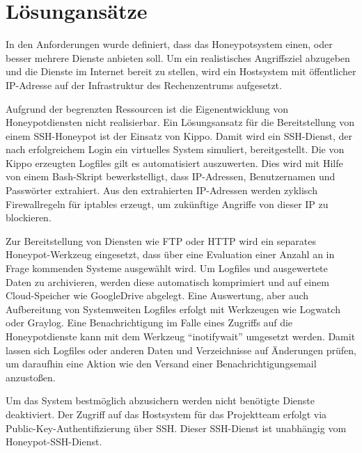 \chapter{Lösungansätze}
\label{ch:Lösungansätze}

In den Anforderungen wurde definiert, dass das Honeypotsystem einen, oder besser mehrere Dienste anbieten soll. Um ein realistisches Angriffsziel abzugeben und die Dienste im Internet bereit zu stellen, wird ein Hostsystem mit öffentlicher IP-Adresse auf der Infrastruktur des Rechenzentrums aufgesetzt.

Aufgrund der begrenzten Ressourcen ist die Eigenentwicklung von Honeypotdiensten  nicht realisierbar. Ein Lösungsansatz für die Bereitstellung von einem SSH-Honeypot ist der Einsatz von Kippo. Damit wird ein SSH-Dienst, der nach erfolgreichem Login ein virtuelles System simuliert, bereitgestellt. Die von Kippo erzeugten Logfiles gilt es automatisiert auszuwerten. Dies wird mit Hilfe von einem Bash-Skript bewerkstelligt, dass IP-Adressen, Benutzernamen und Passwörter extrahiert. Aus den extrahierten IP-Adressen werden zyklisch Firewallregeln für iptables erzeugt, um zukünftige Angriffe von dieser IP zu blockieren.

Zur Bereitstellung von Diensten wie FTP oder HTTP wird ein separates Honeypot-Werkzeug eingesetzt, dass über eine Evaluation einer Anzahl an in Frage kommenden Systeme ausgewählt wird.
Um Logfiles und ausgewertete Daten zu archivieren, werden diese automatisch komprimiert und auf einem Cloud-Speicher wie GoogleDrive abgelegt. Eine Auswertung, aber auch Aufbereitung von Systemweiten Logfiles erfolgt mit Werkzeugen wie Logwatch oder Graylog.
Eine Benachrichtigung im Falle eines Zugriffs auf die Honeypotdienste kann mit dem Werkzeug “inotifywait” umgesetzt werden. Damit lassen sich Logfiles oder anderen Daten und Verzeichnisse auf Änderungen prüfen, um daraufhin eine Aktion wie den Versand einer Benachrichtigungsemail anzustoßen.

Um das System bestmöglich abzusichern werden nicht benötigte Dienste deaktiviert. Der Zugriff auf das Hostsystem für das Projektteam erfolgt via Public-Key-Authentifizierung über SSH. Dieser SSH-Dienst ist unabhängig vom Honeypot-SSH-Dienst.
